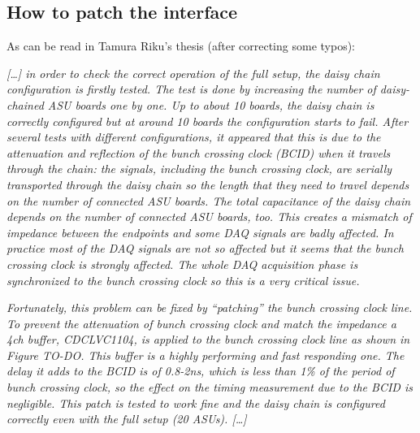 \subsection{How to patch the interface}\label{sec:how-patch-interface}
As can be read in Tamura Riku's thesis (after correcting some typos):

\textit{[\dots] in order to check the correct operation of the full setup, the
  daisy chain configuration is firstly tested. The test is done by increasing
  the number of daisy-chained ASU boards one by one. Up to about 10 boards, the
  daisy chain is correctly configured but at around 10 boards the configuration
  starts to fail. After several tests with different configurations, it appeared
  that this is due to the attenuation and reflection of the bunch crossing clock
  (BCID) when it travels through the chain: the signals, including the bunch
  crossing clock, are serially transported through the daisy chain so the length
  that they need to travel depends on the number of connected ASU boards. The
  total capacitance of the daisy chain depends on the number of connected ASU
  boards, too. This creates a mismatch of impedance between the endpoints and
  some DAQ signals are badly affected. In practice most of the DAQ signals are
  not so affected but it seems that the bunch crossing clock is strongly
  affected. The whole DAQ acquisition phase is synchronized to the bunch
  crossing clock so this is a very critical issue.}

\textit{Fortunately, this problem can be fixed by ``patching'' the bunch
  crossing clock line. To prevent the attenuation of bunch crossing clock and
  match the impedance a 4ch buffer,
  CDCLVC1104\cite{Texas-Instruments:CDCLVC11xx}, is applied to the bunch
  crossing clock line as shown in Figure TO-DO. This buffer is a highly
  performing and fast responding one. The delay it adds to the BCID is of
  0.8-2ns, which is less than 1\% of the period of bunch crossing clock, so the
  effect on the timing measurement due to the BCID is negligible. This patch is
  tested to work fine and the daisy chain is configured correctly even with the
  full setup (20 ASUs). [\dots]}


